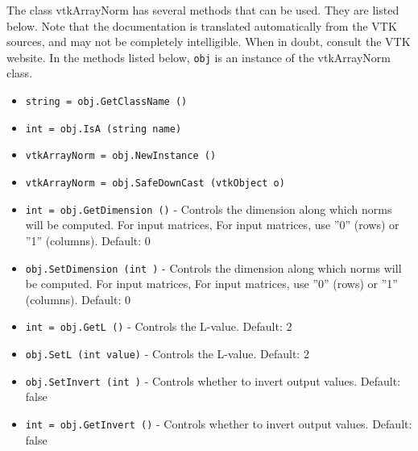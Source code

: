 The class vtkArrayNorm has several methods that can be used.
  They are listed below.
Note that the documentation is translated automatically from the VTK sources,
and may not be completely intelligible.  When in doubt, consult the VTK website.
In the methods listed below, \verb|obj| is an instance of the vtkArrayNorm class.
\begin{itemize}
\item  \verb|string = obj.GetClassName ()|

\item  \verb|int = obj.IsA (string name)|

\item  \verb|vtkArrayNorm = obj.NewInstance ()|

\item  \verb|vtkArrayNorm = obj.SafeDownCast (vtkObject o)|

\item  \verb|int = obj.GetDimension ()| -  Controls the dimension along which norms will be computed.  For input matrices,
 For input matrices, use ''0'' (rows) or ''1'' (columns). Default: 0

\item  \verb|obj.SetDimension (int )| -  Controls the dimension along which norms will be computed.  For input matrices,
 For input matrices, use ''0'' (rows) or ''1'' (columns). Default: 0

\item  \verb|int = obj.GetL ()| -  Controls the L-value.  Default: 2

\item  \verb|obj.SetL (int value)| -  Controls the L-value.  Default: 2

\item  \verb|obj.SetInvert (int )| -  Controls whether to invert output values.  Default: false

\item  \verb|int = obj.GetInvert ()| -  Controls whether to invert output values.  Default: false

\end{itemize}
